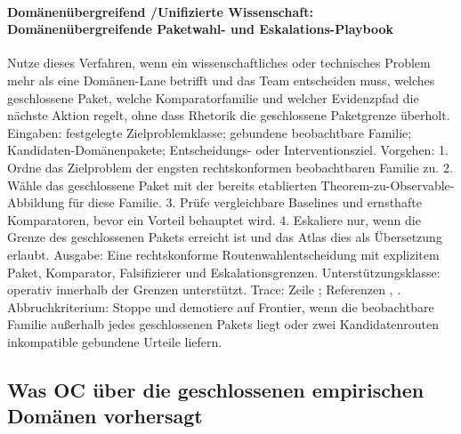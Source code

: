 \paragraph{Domänenübergreifend /\allowbreak Unifizierte Wissenschaft: Domänenübergreifende Paketwahl- und Eskalations-Playbook}
Nutze dieses Verfahren, wenn ein wissenschaftliches oder technisches Problem mehr als eine Domänen-Lane betrifft und das Team entscheiden muss, welches geschlossene Paket, welche Komparatorfamilie und welcher Evidenzpfad die nächste Aktion regelt, ohne dass Rhetorik die geschlossene Paketgrenze überholt.
Eingaben: festgelegte Zielproblemklasse; \allowbreak gebundene beobachtbare Familie; \allowbreak Kandidaten-Domänenpakete; \allowbreak Entscheidungs- oder Interventionsziel.
Vorgehen: 1. Ordne das Zielproblem der engsten rechtskonformen beobachtbaren Familie zu. 2. Wähle das geschlossene Paket mit der bereits etablierten Theorem-zu-Observable-Abbildung für diese Familie. 3. Prüfe vergleichbare Baselines und ernsthafte Komparatoren, bevor ein Vorteil behauptet wird. 4. Eskaliere nur, wenn die Grenze des geschlossenen Pakets erreicht ist und das Atlas dies als Übersetzung erlaubt.
Ausgabe: Eine rechtskonforme Routenwahlentscheidung mit explizitem Paket, Komparator, Falsifizierer und Eskalationsgrenzen.
Unterstützungsklasse: operativ innerhalb der Grenzen unterstützt.
Trace: Zeile ; \allowbreak Referenzen , \allowbreak {}.
Abbruchkriterium: Stoppe und demotiere auf Frontier, wenn die beobachtbare Familie außerhalb jedes geschlossenen Pakets liegt oder zwei Kandidatenrouten inkompatible gebundene Urteile liefern.

\subsection{Was OC über die geschlossenen empirischen Domänen vorhersagt}

